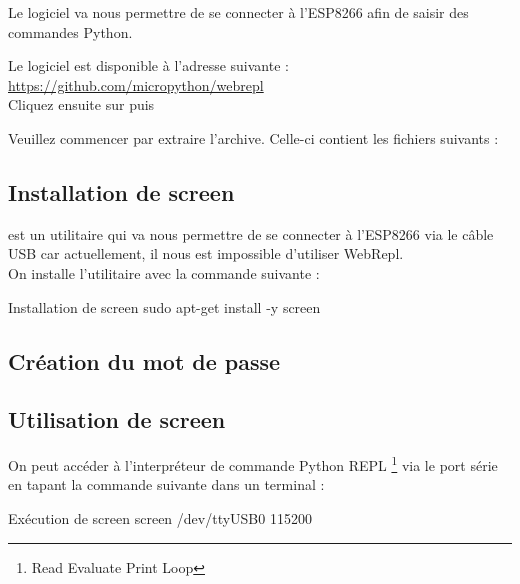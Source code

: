 Le logiciel  va nous permettre de se connecter à l'ESP8266 afin de saisir des commandes Python.

Le logiciel est disponible à l'adresse suivante : \\

\url{https://github.com/micropython/webrepl}\\

Cliquez ensuite sur  puis 


Veuillez commencer par extraire l'archive.
Celle-ci contient les fichiers suivants : 


\subsection{Installation de screen}

 est un utilitaire qui va nous permettre de se connecter à l'ESP8266 via le câble USB car actuellement, il nous est impossible d'utiliser WebRepl.\\
On installe l'utilitaire avec la commande suivante : 
\begin{Bash}{Installation de screen}
sudo apt-get install -y screen
\end{Bash}

\subsection{Création du mot de passe}

\subsection{Utilisation de screen}

On peut accéder à l’interpréteur de commande Python REPL \footnote{Read Evaluate Print Loop} via le port série en tapant la commande suivante dans un terminal :

\begin{Bash}{Exécution de screen}
screen /dev/ttyUSB0 115200
\end{Bash}



